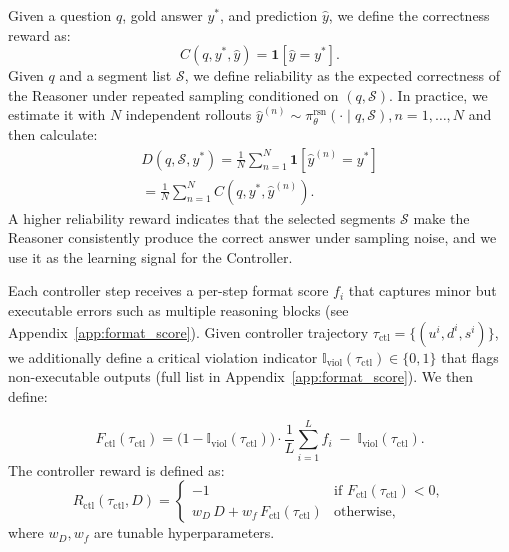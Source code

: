 Given a question $q$, gold answer $y^*$, and prediction $\hat{y}$, we define the correctness reward as:
\begin{equation}
C(q,y^*,\hat{y}) = \mathbf{1}\!\left[\hat y = y^*\right].
\label{eq:correctness}
\end{equation}
%
Given $q$ and a segment list $\mathcal{S}$, we define reliability as the expected correctness of the Reasoner under repeated sampling conditioned on $(q,\mathcal{S})$.
In practice, we estimate it with $N$ independent rollouts $\hat{y}^{(n)} \sim \pi_\theta^{\text{rsn}}(\cdot \mid q,\mathcal{S}), n=1,\dots,N$ and then calculate:
\begin{equation}
\begin{split}
D(q,\mathcal{S},y^*)
=
\frac{1}{N}\sum_{n=1}^{N}\mathbf{1}\!\left[\hat y^{(n)} = y^*\right]
\\
=
\frac{1}{N}\sum_{n=1}^{N}C(q,y^*,\hat{y}^{(n)}).
\end{split}
\label{eq:reliability}
\end{equation}
A higher reliability reward indicates that the selected segments $\mathcal{S}$ make the Reasoner consistently produce the correct answer under sampling noise, and we use it as the learning signal for the Controller.


Each controller step receives a per-step format score $f_i$ that captures minor but executable errors such as multiple reasoning blocks (see Appendix~\ref{app:format_score}). 
Given controller trajectory $\tau_{\text{ctl}}=\{(u^i,d^i,s^i)\}$, we additionally define a critical violation indicator $\mathbb{I}_{\text{viol}}(\tau_{\text{ctl}})\in\{0,1\}$ that flags non-executable outputs (full list in Appendix~\ref{app:format_score}). We then define:

\begin{equation}
F_{\text{ctl}}(\tau_{\text{ctl}})
=
\bigl(1-\mathbb{I}_{\text{viol}}(\tau_{\text{ctl}})\bigr)\cdot
\frac{1}{L}\sum_{i=1}^{L} f_i
\;-\;
\mathbb{I}_{\text{viol}}(\tau_{\text{ctl}}).
\label{eq:ctrl-format-ind}
\end{equation}
%
The controller reward is defined as:
\begin{equation}
R_{\text{ctl}}(\tau_{\text{ctl}}, D) =
\begin{cases}
-1 & \text{if } F_{\text{ctl}}(\tau_{\text{ctl}}) < 0,\\[4pt]
w_D\,D + w_f\,F_{\text{ctl}}(\tau_{\text{ctl}}) & \text{otherwise},
\end{cases}
\label{eq:ctrl-reward}
\end{equation}
where $w_D, w_f$ are tunable hyperparameters.
%

